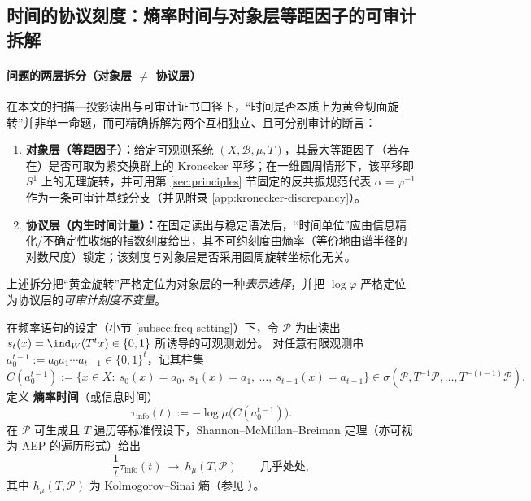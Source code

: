 \subsection{时间的协议刻度：熵率时间与对象层等距因子的可审计拆解}\label{subsec:time-protocol-entropy-vs-rotation}
\paragraph{问题的两层拆分（对象层 \texorpdfstring{$\neq$}{≠} 协议层）}
在本文的扫描—投影读出与可审计证书口径下，“时间是否本质上为黄金切面旋转”并非单一命题，而可精确拆解为两个互相独立、且可分别审计的断言：
\begin{enumerate}
  \item \textbf{对象层（等距因子）：}给定可观测系统 \((X,\mathcal{B},\mu,T)\)，其最大等距因子（若存在）是否可取为紧交换群上的 Kronecker 平移；在一维圆周情形下，该平移即 \(S^1\) 上的无理旋转，并可用第 \ref{sec:principles} 节固定的反共振规范代表 \(\alpha=\varphi^{-1}\) 作为一条可审计基线分支（并见附录 \ref{app:kronecker-discrepancy}）。
  \item \textbf{协议层（内生时间计量）：}在固定读出与稳定语法后，“时间单位”应由信息精化/不确定性收缩的指数刻度给出，其不可约刻度由熵率（等价地由谱半径的对数尺度）锁定；该刻度与对象层是否采用圆周旋转坐标化无关。
\end{enumerate}
上述拆分把“黄金旋转”严格定位为对象层的一种\emph{表示选择}，并把 \(\log\varphi\) 严格定位为协议层的\emph{可审计刻度不变量}。
\par

\begin{definition}\label{def:entropy-rate-time}
在频率语句的设定（小节 \ref{subsec:freq-setting}）下，令 \(\mathcal{P}\) 为由读出 \(s_t(x)=\ind_W(T^t x)\in\{0,1\}\) 所诱导的可观测划分。
对任意有限观测串 \(a_0^{t-1}:=a_0a_1\cdots a_{t-1}\in\{0,1\}^t\)，记其柱集
\[
C(a_0^{t-1})
:=\bigl\{x\in X:\ s_0(x)=a_0,\ s_1(x)=a_1,\ \dots,\ s_{t-1}(x)=a_{t-1}\bigr\}\in\sigma(\mathcal{P},T^{-1}\mathcal{P},\dots,T^{-(t-1)}\mathcal{P}).
\]
定义 \textbf{熵率时间}（或信息时间）
\[
\tau_{\mathrm{info}}(t)
:=-\log \mu\bigl(C(a_0^{t-1})\bigr).
\]
在 \(\mathcal{P}\) 可生成且 \(T\) 遍历等标准假设下，Shannon--McMillan--Breiman 定理（亦可视为 AEP 的遍历形式）给出
\[
\frac{1}{t}\tau_{\mathrm{info}}(t)\ \longrightarrow\ h_\mu(T,\mathcal{P})
\qquad\text{几乎处处},
\]
其中 \(h_\mu(T,\mathcal{P})\) 为 Kolmogorov--Sinai 熵（参见 \cite{WaltersErgodicTheory,CoverThomas2006}）。
\end{definition}

